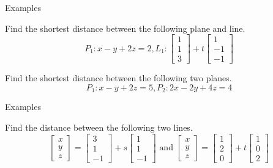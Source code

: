 \documentclass{beamer}
\begin{document}
\begin{frame}{Examples}
\begin{example}
Find the shortest distance between the following plane and line.
\begin{equation*}
P_1:x-y+2z=2, L_1:\left[
\begin{array}{c}
1\\
1\\
3
\end{array}
\right]+t \left[
\begin{array}{c}
1\\
-1\\
-1
\end{array}
\right]
\end{equation*}
\end{example}
\begin{example}
Find the shortest distance between the following two planes.
\begin{equation*}
P_1:x-y+2z=5, P_2:2x-2y+4z=4
\end{equation*}
\end{example}
\end{frame}

\begin{frame}{Examples}
\begin{example}
Find the distance between the following two lines.
\begin{equation*}
\left[
\begin{array}{c}
x\\
y\\
z
\end{array}
\right] = \left[
\begin{array}{c}
3\\
1\\
-1
\end{array}
\right]+s \left[
\begin{array}{c}
1\\
1\\
-1
\end{array}
\right]\text{ and } \left[
\begin{array}{c}
x\\
y\\
z
\end{array}
\right] = \left[
\begin{array}{c}
1\\
2\\
0
\end{array}
\right] +t \left[
\begin{array}{c}
1\\
0\\
2
\end{array}
\right]
\end{equation*}
\end{example}
\end{frame}
\end{document}
